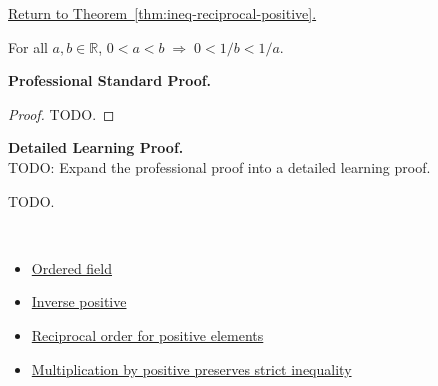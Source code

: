 \newpage
{}
\label{prf:ineq-reciprocal-positive}

\begin{remark*}[Return]
\hyperref[thm:ineq-reciprocal-positive]{Return to Theorem~\ref*{thm:ineq-reciprocal-positive}.}
\end{remark*}

\begin{theorem*}
For all $a, b \in \mathbb{R}$,
$0 < a < b \;\Rightarrow\; 0 < 1/b < 1/a$.
\end{theorem*}

\textbf{Professional Standard Proof.}~\\
\begin{proof}
TODO.
\end{proof}

\textbf{Detailed Learning Proof.}~\\
TODO: Expand the professional proof into a detailed learning proof.


\begin{remark*}
TODO.
\end{remark*}

\begin{remark*}[Dependencies]~\\
\begin{itemize}
  \item \hyperref[def:ordered-field]{Ordered field}
  \item \hyperref[thm:inverse-positive]{Inverse positive}
  \item \hyperref[thm:reciprocal-order-for-positive-elements]{Reciprocal order for positive elements}
  \item \hyperref[thm:ineq-multiply-positive]{Multiplication by positive preserves strict inequality}
\end{itemize}
\end{remark*}
